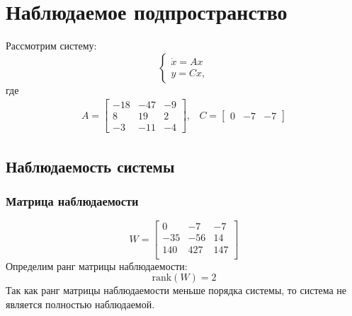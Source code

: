 \section{Наблюдаемое подпространство}

Рассмотрим систему: 
\begin{equation}
    \begin{cases}
        \dot{x} = Ax \\
        y = Cx,
    \end{cases}
\end{equation}
где 
\begin{equation}
    \begin{array}{cc}
        A = \begin{bmatrix}
            -18 & -47 & -9 \\
            8 & 19 & 2 \\
            -3 & -11 & -4
        \end{bmatrix}, &
        C = \begin{bmatrix}
            0 & -7 & -7
        \end{bmatrix}
    \end{array}
\end{equation}

\subsection{Наблюдаемость системы}
\subsubsection{Матрица наблюдаемости}
\begin{equation}
    W = \begin{bmatrix}
        0  & -7  & -7 \\ 
        -35  & -56  & 14 \\ 
        140  & 427  & 147 \\ 
        \end{bmatrix}
\end{equation}
Определим ранг матрицы наблюдаемости:
\begin{equation}
    \text{rank}(W) = 2
\end{equation}
Так как ранг матрицы наблюдаемости меньше порядка системы, то система не является полностью наблюдаемой. 

